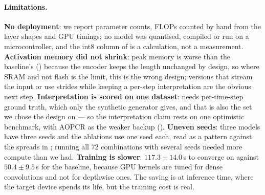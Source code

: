 \paragraph{Limitations.}
\textbf{No deployment}: we report parameter counts, FLOPs counted by hand from the layer shapes and
GPU timings; no model was quantised, compiled or run on a microcontroller, and the int8 column of
 is a calculation, not a measurement. \textbf{Activation memory did not shrink}: peak
memory is worse than the baseline's () because the encoder keeps the length
unchanged by design, so where SRAM and not flash is the limit, this is the wrong design; versions
that stream the input or use strides while keeping a per-step interpretation are the obvious next
step. \textbf{Interpretation is scored on one dataset}: \ndcg{} needs per-time-step ground truth,
which only the synthetic \webtraffic{} generator gives, and that is also the set we chose the design
on --- so the interpretation claim rests on one optimistic benchmark, with AOPCR as the weaker backup
(). \textbf{Uneven seeds}: three models have three seeds and the ablations use one
seed each, read as a pattern against the spreads in ; running all 72 combinations with
several seeds needed more compute than we had. \textbf{Training is slower}: $117.3 \pm 14.0$\,s to
converge on \webtraffic{} against $50.4 \pm 9.5$\,s for the baseline, because GPU kernels are tuned
for dense convolutions and not for depthwise ones. The saving is at inference time, where the target
device spends its life, but the training cost is real.
